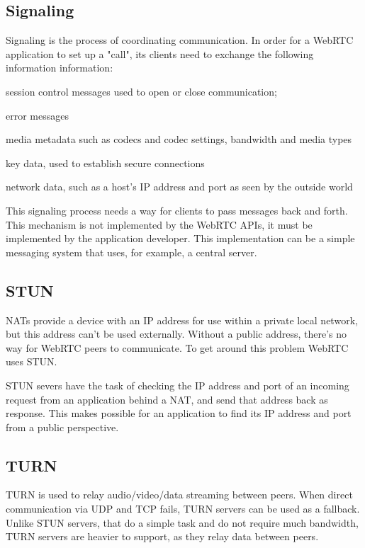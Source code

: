 \subsection{Signaling}
\label{sec:signaling}
Signaling\cite{site_webrtc_signaling} is the process of coordinating communication. In order for a WebRTC application to set up a "call", its clients need to exchange the following information information: \begin{enumerate*}[(i)]
\item session control messages used to open or close communication;
\item error messages
\item media metadata such as codecs and codec settings, bandwidth and media types
\item key data, used to establish secure connections
\item network data, such as a host's IP address and port as seen by the outside world
\end{enumerate*}\par
This signaling process needs a way for clients to pass messages back and forth. This mechanism is not implemented by the WebRTC APIs, it must be implemented by the application developer. This implementation can be a simple messaging system that uses, for example, a central server.

\subsection{STUN}
\label{sec:stun}
NATs provide a device with an IP address for use within a private local network, but this address can't be used externally. Without a public address, there's no way for WebRTC peers to communicate. To get around this problem WebRTC uses STUN.\par
	STUN severs have the task of checking the IP address and port of an incoming request from an application behind a NAT, and send that address back as response. This makes possible for an application to find its IP address and port from a public perspective.
	
\subsection{TURN}
\label{sec:turn}
TURN is used to relay audio/video/data streaming between peers. When direct communication via UDP and TCP fails, TURN servers can be used as a fallback. Unlike STUN servers, that do a simple task and do not require much bandwidth, TURN servers are heavier to support, as they relay data between peers.


